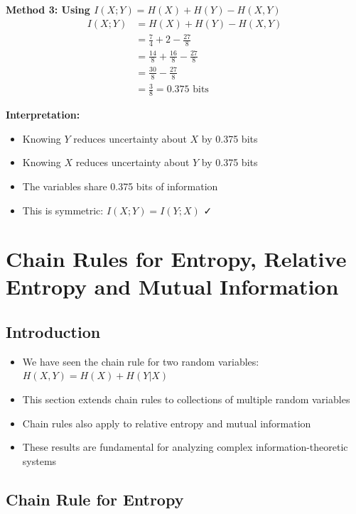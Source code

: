 \documentclass[11pt,a4paper]{book}
\newcounter{qna}[chapter]
\renewcommand{\theqna}{\thechapter.\arabic{qna}}
\newenvironment{questionanswerbox}{
    \refstepcounter{qna}%
    \begin{tcolorbox}[
        enhanced,
        breakable,
        colback=softlavender!10,
        colframe=softlavender!200,
        title={Example~\theqna}, %
        fonttitle=\bfseries,
        coltitle=white,
        colbacktitle=softlavender!200,
        sharp corners,
        boxrule=1pt,
        left=8pt,
        right=8pt,
        top=6pt,
        bottom=6pt
    ]
}{
    \end{tcolorbox}
}
\begin{document}
\begin{questionanswerbox}
    \textbf{Method 3: Using \(I(X;Y) = H(X) + H(Y) - H(X,Y)\)}
    \begin{align*}
    I(X;Y) &= H(X) + H(Y) - H(X,Y) \\
    &= \frac{7}{4} + 2 - \frac{27}{8} \\
    &= \frac{14}{8} + \frac{16}{8} - \frac{27}{8} \\
    &= \frac{30}{8} - \frac{27}{8} \\
    &= \frac{3}{8} = 0.375 \text{ bits}
    \end{align*}
    
    \textbf{Interpretation:}
    \begin{itemize}
        \item Knowing \(Y\) reduces uncertainty about \(X\) by 0.375 bits
        \item Knowing \(X\) reduces uncertainty about \(Y\) by 0.375 bits
        \item The variables share 0.375 bits of information
        \item This is symmetric: \(I(X;Y) = I(Y;X)\) ✓
    \end{itemize}
\end{questionanswerbox}

\section{Chain Rules for Entropy, Relative Entropy and Mutual Information}

\subsection{Introduction}
    \begin{itemize}
        \item We have seen the chain rule for two random variables: \(H(X,Y) = H(X) + H(Y|X)\)
        \item This section extends chain rules to collections of multiple random variables
        \item Chain rules also apply to relative entropy and mutual information
        \item These results are fundamental for analyzing complex information-theoretic systems
    \end{itemize}

\subsection{Chain Rule for Entropy}
\end{document}
